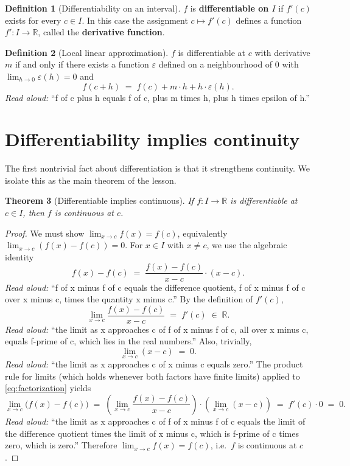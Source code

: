 \documentclass[11pt]{article}
\newtheorem{theorem}{Theorem}
\theoremstyle{definition}
\newtheorem{definition}[theorem]{Definition}
\theoremstyle{remark}
\begin{document}
\begin{definition}[Differentiability on an interval]
$f$ is \textbf{differentiable on $I$} if $f'(c)$ exists for every $c \in I$.
In this case the assignment $c \mapsto f'(c)$ defines a function
$f' : I \to \mathbb{R}$, called the \textbf{derivative function}.
\end{definition}

\begin{definition}[Local linear approximation]
$f$ is differentiable at $c$ with derivative $m$ if and only if there exists
a function $\varepsilon$ defined on a neighbourhood of $0$ with
$\lim_{h \to 0} \varepsilon(h) = 0$ and
\[
f(c + h) \;=\; f(c) + m \cdot h + h \cdot \varepsilon(h).
\]
\emph{Read aloud:} ``f of c plus h equals f of c, plus m times h, plus h times epsilon of h.''
\end{definition}

\section{Differentiability implies continuity}

The first nontrivial fact about differentiation is that it strengthens
continuity. We isolate this as the main theorem of the lesson.

\begin{theorem}[Differentiable implies continuous]
\label{thm:diff-implies-cts}
If $f : I \to \mathbb{R}$ is differentiable at $c \in I$, then $f$ is
continuous at $c$.
\end{theorem}

\begin{proof}
We must show $\lim_{x \to c} f(x) = f(c)$, equivalently
$\lim_{x \to c} (f(x) - f(c)) = 0$. For $x \in I$ with $x \neq c$, we use the
algebraic identity
\begin{equation}
\label{eq:factorization}
f(x) - f(c) \;=\; \frac{f(x) - f(c)}{x - c} \cdot (x - c).
\end{equation}
\emph{Read aloud:} ``f of x minus f of c equals the difference quotient, f of x minus f of c over x minus c, times the quantity x minus c.''
By the definition of $f'(c)$,
\[
\lim_{x \to c} \frac{f(x) - f(c)}{x - c} \;=\; f'(c) \;\in\; \mathbb{R}.
\]
\emph{Read aloud:} ``the limit as x approaches c of f of x minus f of c, all over x minus c, equals f-prime of c, which lies in the real numbers.''
Also, trivially,
\[
\lim_{x \to c} (x - c) \;=\; 0.
\]
\emph{Read aloud:} ``the limit as x approaches c of x minus c equals zero.''
The product rule for limits (which holds whenever both factors have finite
limits) applied to \eqref{eq:factorization} yields
\[
\lim_{x \to c} \bigl(f(x) - f(c)\bigr)
\;=\; \left( \lim_{x \to c} \frac{f(x) - f(c)}{x - c} \right)
      \cdot \left( \lim_{x \to c} (x - c) \right)
\;=\; f'(c) \cdot 0 \;=\; 0.
\]
\emph{Read aloud:} ``the limit as x approaches c of f of x minus f of c equals the limit of the difference quotient times the limit of x minus c, which is f-prime of c times zero, which is zero.''
Therefore $\lim_{x \to c} f(x) = f(c)$, i.e.\ $f$ is continuous at $c$.
\end{proof}
\end{document}
